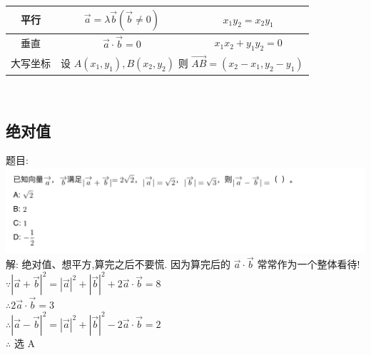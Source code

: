 \documentclass[hyperref, UTF8,11pt,a4paper]{ctexart} %
\begin{document}
{\begin{tabular}{|c|c|c|}
		\hline
		平行                           & $\vec{a}=\lambda \vec{b}(\vec{b} \neq 0)$                                                                                                         & $x_{1} y_{2}=x_{2} y_{1}$                                                                           \\
		\hline
		垂直                           & $\vec{a} \cdot \vec{b}=0$                                                                                                                         & $x_{1} x_{2}+y_{1} y_{2}=0$                                                                         \\
		\hline
		大写坐标                       & \multicolumn{2}{c}{ 设 $A\left(x_{1}, y_{1}\right), B\left(x_{2}, y_{2}\right)$ 则 $\overrightarrow{A B}=\left(x_{2}-x_{1}, y_{2}-y_{1}\right)$ }                                                                                                       \\
		\hline
	\end{tabular} \\
	\par}

\subsection{绝对值}
{\color{red}  题目: } \\
\includegraphics[width=500pt]  {pic/xiangliang/jueduizhi.jpg} \\
解: {\color{blue} 绝对值、想平方,算完之后不要慌. 因为算完后的 $\vec{a} \cdot \vec{b}$ 常常作为一个整体看待!}\\
$\because |\vec{a}+\vec{b}|^{2}=|\vec{a}|^{2}+|\vec{b}|^{2}+2 \vec{a} \cdot \vec{b}=8$ \\
$ \therefore 2 \vec{a} \cdot \vec{b}=3$ \\
$\therefore |\vec{a}-\vec{b}|^{2}=|\vec{a}|^{2}+|\vec{b}|^{2}-2 \vec{a} \cdot \vec{b}=2$ \\
$\therefore $ 选 A
\end{document}

